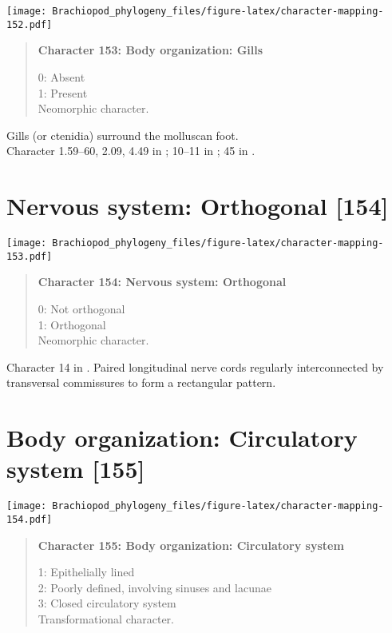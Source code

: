 \documentclass[openany]{book}
\theoremstyle{definition}
\theoremstyle{definition}
\theoremstyle{definition}
\theoremstyle{remark}
\begin{document}
\texttt{[image: Brachiopod\_phylogeny\_files/figure-latex/character-mapping-152.pdf]}

\begin{quote}
\textbf{Character 153: Body organization: Gills}

0: Absent\\
1: Present\\
Neomorphic character.
\end{quote}

Gills (or ctenidia) surround the molluscan foot.\\
Character 1.59--60, 2.09, 4.49 in \citet{SPS1996}; 10--11 in
\citet{Haszprunar2000}; 45 in \citet{Sutton2012}.

\section{Nervous system: Orthogonal
{[}154{]}}\label{nervous-system-orthogonal-154}

\texttt{[image: Brachiopod\_phylogeny\_files/figure-latex/character-mapping-153.pdf]}

\begin{quote}
\textbf{Character 154: Nervous system: Orthogonal}

0: Not orthogonal\\
1: Orthogonal\\
Neomorphic character.
\end{quote}

Character 14 in \citet{Haszprunar1996}. Paired longitudinal nerve cords
regularly interconnected by transversal commissures to form a
rectangular pattern.

\section{Body organization: Circulatory system
{[}155{]}}\label{body-organization-circulatory-system-155}

\texttt{[image: Brachiopod\_phylogeny\_files/figure-latex/character-mapping-154.pdf]}

\begin{quote}
\textbf{Character 155: Body organization: Circulatory system}

1: Epithelially lined\\
2: Poorly defined, involving sinuses and lacunae\\
3: Closed circulatory system\\
Transformational character.
\end{quote}
\end{document}
